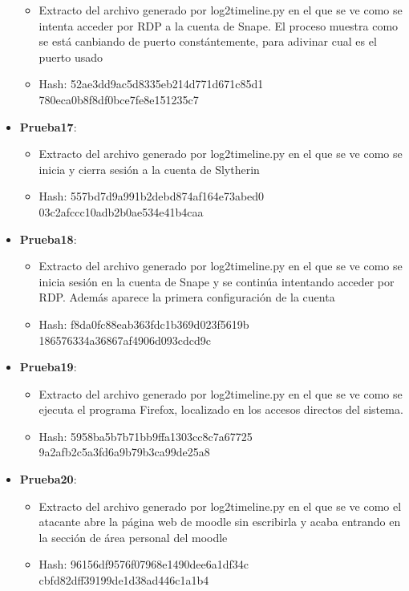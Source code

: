 \begin{itemize}
{\begin{itemize}
      \item{Extracto del archivo generado por log2timeline.py en el que se ve como se intenta acceder por RDP a la cuenta de Snape. El proceso muestra como se está canbiando de puerto constántemente, para adivinar cual es el puerto usado}
      \item{Hash}: 52ae3dd9ac5d8335eb214d771d671c85d1\\780eca0b8f8df0bce7fe8e151235c7
    \end{itemize}}
  \item{\textbf{Prueba17}: 
    \begin{itemize}
      \item{Extracto del archivo generado por log2timeline.py en el que se ve como se inicia y cierra sesión a la cuenta de Slytherin}
      \item{Hash}: 557bd7d9a991b2debd874af164e73abed0\\03c2afccc10adb2b0ae534e41b4caa
    \end{itemize}}
  \item{\textbf{Prueba18}: 
    \begin{itemize}
      \item{Extracto del archivo generado por log2timeline.py en el que se ve como se inicia sesión en la cuenta de Snape y se continúa intentando acceder por RDP. Además aparece la primera configuración de la cuenta}
      \item{Hash}: f8da0fc88eab363fdc1b369d023f5619b\\186576334a36867af4906d093cdcd9c
    \end{itemize}}
  \item{\textbf{Prueba19}: 
    \begin{itemize}
      \item{Extracto del archivo generado por log2timeline.py en el que se ve como se ejecuta el programa Firefox, localizado en los accesos directos del sistema.}
      \item{Hash}: 5958ba5b7b71bb9ffa1303cc8c7a67725\\9a2afb2c5a3fd6a9b79b3ca99de25a8
    \end{itemize}}
  \item{\textbf{Prueba20}: 
    \begin{itemize}
      \item{Extracto del archivo generado por log2timeline.py en el que se ve como el atacante abre la página web de moodle sin escribirla y acaba entrando en la sección de área personal del moodle}
      \item{Hash}: 96156df9576f07968e1490dee6a1df34c\\cbfd82dff39199de1d38ad446c1a1b4

\end{itemize}}
\end{itemize}
